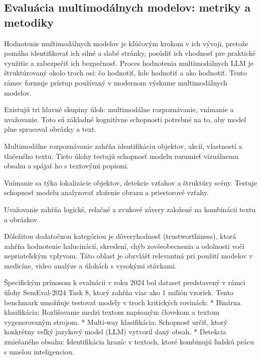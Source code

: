 \documentclass[]{tukediphc}
\begin{document}
\subsection{Evaluácia multimodálnych modelov: metriky a metodiky}

Hodnotenie multimodálnych modelov je kľúčovým krokom v ich vývoji, pretože pomáha identifikovať ich silné a slabé stránky, posúdiť ich vhodnosť pre praktické využitie a zabezpečiť ich bezpečnosť. Proces hodnotenia multimodálnych LLM je štruktúrovaný okolo troch osí: čo hodnotiť, kde hodnotiť a ako hodnotiť\cite{researchgate:A_Survey_on_Evaluation_of_Multimodal_Large_Language_Models}. Tento rámec formuje prístup používaný v modernom výskume multimodálnych modelov.

Existujú tri hlavné skupiny úloh: multimodálne rozpoznávanie, vnímanie a uvažovanie. Toto sú základné kognitívne schopnosti potrebné na to, aby model plne spracoval obrázky a text\cite{researchgate:A_Survey_on_Evaluation_of_Multimodal_Large_Language_Models}. 

Multimodálne rozpoznávanie zahŕňa identifikáciu objektov, akcií, vlastností a tlačeného textu. Tieto úlohy testujú schopnosť modelu rozumieť vizuálnemu obsahu a spájať ho s textovými popismi.

Vnímanie sa týka lokalizácie objektov, detekcie vzťahov a štruktúry scény. Testuje schopnosť modelu analyzovať zloženie obrazu a priestorové vzťahy.

Uvažovanie zahŕňa logické, relačné a zvukové závery založené na kombinácii textu a obrázkov.

Dôležitou dodatočnou kategóriou je dôveryhodnosť (trustworthiness), ktorá zahŕňa hodnotenie halucinácií, skreslení, chýb zovšeobecnenia a odolnosti voči nepriateľským vplyvom. Táto oblasť je obzvlášť relevantná pri použití modelov v medicíne, video analýze a úlohách s vysokými stávkami.

Špecifickým prínosom k evaluácii v roku 2024 bol dataset predstavený v rámci úlohy SemEval-2024 Task 8, ktorý zahŕňa viac ako 1 milión vzoriek. Tento benchmark umožňuje testovať modely v troch kritických rovinách: * Binárna klasifikácia: Rozlišovanie medzi textom napísaným človekom a textom vygenerovaným strojom. * Multi-way klasifikácia: Schopnosť určiť, ktorý konkrétny veľký jazykový model (LLM) vytvoril daný obsah. * Detekcia zmiešaného obsahu: Identifikácia hraníc v textoch, ktoré kombinujú ľudskú prácu s umelou inteligenciou\cite{Fine-tuning_Language_Models_for_AI_vs_Human_Generated_Text_detection}.
\end{document}
